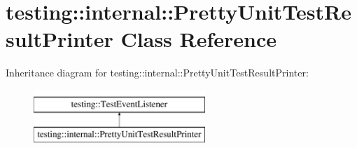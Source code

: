 \hypertarget{classtesting_1_1internal_1_1PrettyUnitTestResultPrinter}{}\section{testing\+::internal\+::Pretty\+Unit\+Test\+Result\+Printer Class Reference}
\label{classtesting_1_1internal_1_1PrettyUnitTestResultPrinter}
Inheritance diagram for testing\+::internal\+::Pretty\+Unit\+Test\+Result\+Printer\+:\begin{figure}[H]
\begin{center}
\leavevmode
\includegraphics[height=2.000000cm]{classtesting_1_1internal_1_1PrettyUnitTestResultPrinter}
\end{center}
\end{figure}

